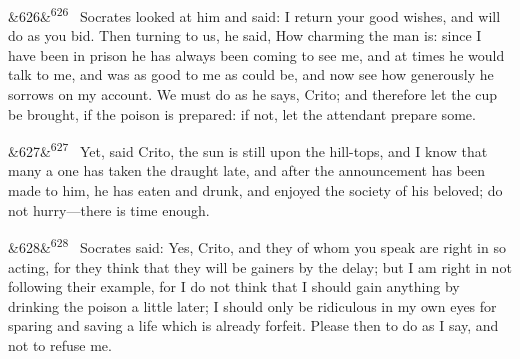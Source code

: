 \documentclass[12pt]{article}
\newcommand{\para}[1][]{\par\noindent\ifx&#1&\else\textsuperscript{\footnotesize #1}~\fi}
\begin{document}
\para[626] Socrates looked at him and said: I return your good wishes, and will do as you bid. Then turning to us, he said, How charming the man is: since I have been in prison he has always been coming to see me, and at times he would talk to me, and was as good to me as could be, and now see how generously he sorrows on my account. We must do as he says, Crito; and therefore let the cup be brought, if the poison is prepared: if not, let the attendant prepare some.

\para[627] Yet, said Crito, the sun is still upon the hill-tops, and I know that many a one has taken the draught late, and after the announcement has been made to him, he has eaten and drunk, and enjoyed the society of his beloved; do not hurry---there is time enough.

\para[628] Socrates said: Yes, Crito, and they of whom you speak are right in so acting, for they think that they will be gainers by the delay; but I am right in not following their example, for I do not think that I should gain anything by drinking the poison a little later; I should only be ridiculous in my own eyes for sparing and saving a life which is already forfeit. Please then to do as I say, and not to refuse me.
\end{document}
